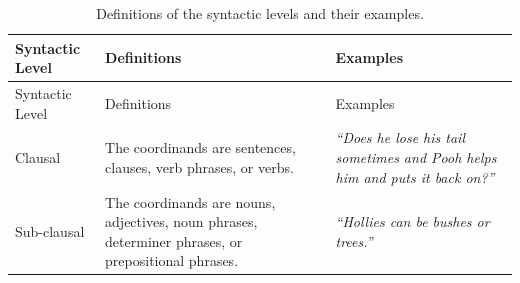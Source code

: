 \documentclass[floatsintext,man]{apa6}
\theoremstyle{definition}
\theoremstyle{definition}
\theoremstyle{definition}
\theoremstyle{remark}
\begin{document}
\begin{longtable}[]{@{}lll@{}}
\caption{\label{tab:syntacticLevel} Definitions of the syntactic levels and
their examples.}\tabularnewline
\toprule
\begin{minipage}[b]{0.17\columnwidth}\raggedright\strut
Syntactic Level\strut
\end{minipage} & \begin{minipage}[b]{0.37\columnwidth}\raggedright\strut
Definitions\strut
\end{minipage} & \begin{minipage}[b]{0.37\columnwidth}\raggedright\strut
Examples\strut
\end{minipage}\tabularnewline
\midrule
\endfirsthead
\toprule
\begin{minipage}[b]{0.17\columnwidth}\raggedright\strut
Syntactic Level\strut
\end{minipage} & \begin{minipage}[b]{0.37\columnwidth}\raggedright\strut
Definitions\strut
\end{minipage} & \begin{minipage}[b]{0.37\columnwidth}\raggedright\strut
Examples\strut
\end{minipage}\tabularnewline
\midrule
\endhead
\begin{minipage}[t]{0.17\columnwidth}\raggedright\strut
Clausal\strut
\end{minipage} & \begin{minipage}[t]{0.37\columnwidth}\raggedright\strut
The coordinands are sentences, clauses, verb phrases, or verbs.\strut
\end{minipage} & \begin{minipage}[t]{0.37\columnwidth}\raggedright\strut
\emph{\enquote{Does he lose his tail sometimes and Pooh helps him and
puts it back on?}}\strut
\end{minipage}\tabularnewline
\begin{minipage}[t]{0.17\columnwidth}\raggedright\strut
Sub-clausal\strut
\end{minipage} & \begin{minipage}[t]{0.37\columnwidth}\raggedright\strut
The coordinands are nouns, adjectives, noun phrases, determiner phrases,
or prepositional phrases.\strut
\end{minipage} & \begin{minipage}[t]{0.37\columnwidth}\raggedright\strut
\emph{\enquote{Hollies can be bushes or trees.}}\strut
\end{minipage}\tabularnewline
\bottomrule
\end{longtable}
\end{document}
